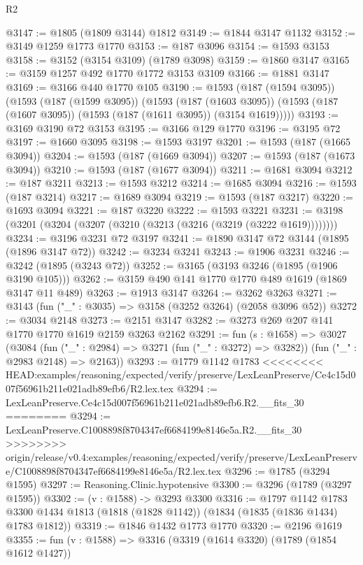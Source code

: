\begin{lexlean}{R2}
\begin{coremodule}
{{{{{{{{{{{{{{{{{{{{{{{{{{{{{{{{{{{{{{{{{{{{{{{{{{{{{{{{{{{{{{{{{{{{{{{{{{{{{{{{{{{{{{{{{{{{@3147 := @1805 (@1809 @3144) @1812
@3149 := @1844 @3147 @1132
@3152 := @3149 @1259 @1773 @1770
@3153 := @187 @3096
@3154 := @1593 @3153
@3158 := @3152 (@3154 @3109) (@1789 @3098)
@3159 := @1860 @3147
@3165 := @3159 @1257 @492 @1770 @1772 @3153 @3109
@3166 := @1881 @3147
@3169 := @3166 @440 @1770 @105
@3190 := @1593
    (@187 (@1594 @3095))
    (@1593
      (@187 (@1599 @3095))
      (@1593
        (@187 (@1603 @3095))
        (@1593 (@187 (@1607 @3095)) (@1593 (@187 (@1611 @3095)) (@3154 @1619)))))
@3193 := @3169 @3190 @72 @3153
@3195 := @3166 @129 @1770
@3196 := @3195 @72
@3197 := @1660 @3095
@3198 := @1593 @3197
@3201 := @1593 (@187 (@1665 @3094))
@3204 := @1593 (@187 (@1669 @3094))
@3207 := @1593 (@187 (@1673 @3094))
@3210 := @1593 (@187 (@1677 @3094))
@3211 := @1681 @3094
@3212 := @187 @3211
@3213 := @1593 @3212
@3214 := @1685 @3094
@3216 := @1593 (@187 @3214)
@3217 := @1689 @3094
@3219 := @1593 (@187 @3217)
@3220 := @1693 @3094
@3221 := @187 @3220
@3222 := @1593 @3221
@3231 := @3198 (@3201 (@3204 (@3207 (@3210 (@3213 (@3216 (@3219 (@3222 @1619))))))))
@3234 := @3196 @3231 @72 @3197
@3241 := @1890 @3147 @72 @3144 (@1895 (@1896 @3147 @72))
@3242 := @3234 @3241
@3243 := @1906 @3231
@3246 := @3242 (@1895 (@3243 @72))
@3252 := @3165 (@3193 @3246 (@1895 (@1906 @3190 @105)))
@3262 := @3159 @490 @141 @1770 @1770 @489 @1619 (@1869 @3147 @11 @489)
@3263 := @1913 @3147
@3264 := @3262 @3263
@3271 := @3143 (fun ("_" : @3035) => @3158 (@3252 @3264) (@2058 @3096 @52))
@3272 := @3034 @2148
@3273 := @2151 @3147
@3282 := @3273 @269 @207 @141 @1770 @1770 @1619 @2159 @3263 @2162
@3291 := fun (s : @1658) =>
  @3027
    (@3084
      (fun ("_" : @2984) => @3271 (fun ("_" : @3272) => @3282))
      (fun ("_" : @2983 @2148) => @2163))
@3293 := @1779 @1142 @1783
<<<<<<<< HEAD:examples/reasoning/expected/verify/preserve/LexLeanPreserve/Ce4c15d007f56961b211e021adb89efb6/R2.lex.tex
@3294 := LexLeanPreserve.Ce4c15d007f56961b211e021adb89efb6.R2.__fits_30
========
@3294 := LexLeanPreserve.C1008898f8704347ef6684199e8146e5a.R2.__fits_30
>>>>>>>> origin/release/v0.4:examples/reasoning/expected/verify/preserve/LexLeanPreserve/C1008898f8704347ef6684199e8146e5a/R2.lex.tex
@3296 := @1785 (@3294 @1595)
@3297 := Reasoning.Clinic.hypotensive
@3300 := @3296 (@1789 (@3297 @1595))
@3302 := (v : @1588) -> @3293 @3300
@3316 := @1797
    @1142
    @1783
    @3300
    @1434
    @1813
    (@1818 (@1828 @1142))
    (@1834 (@1835 (@1836 @1434) @1783 @1812))
@3319 := @1846 @1432 @1773 @1770
@3320 := @2196 @1619
@3355 := fun (v : @1588) =>
  @3316
    (@3319
      (@1614 @3320)
      (@1789 (@1854 @1612 @1427))
}}}}}}}}}}}}}}}}}}}}}}}}}}}}}}}}}}}}}}}}}}}}}}}}}}}}}}}}}}}}}}}}}}}}}}}}}}}}}}}}}}}}}}}}}}}}
\end{coremodule}
\end{lexlean}
